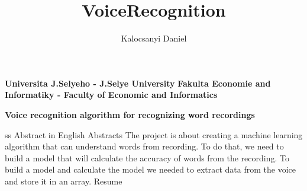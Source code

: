 \documentclass[english,12pt,oneside,a4paper]{article}
\title{VoiceRecognition}
\author{Kalocsanyi Daniel}
\begin{document}
	\begin{center}
	\textbf{Universita J.Selyeho - J.Selye University}
	\textbf{Fakulta Economie and Informatiky - Faculty of Economic and Informatics}
	
	
	\textbf{Voice recognition algorithm for recognizing word recordings}
	
	\newpage
	ss
	Abstract in English
	Abstracts
	The project is about creating a machine learning algorithm that can understand words from recording. To do that, we need to build a model that will calculate the accuracy of words from the recording. To build a model and calculate the model we needed to extract data from the voice and store it in an array.
	\newpage
	Resume
	
	\end{center}
\end{document}
